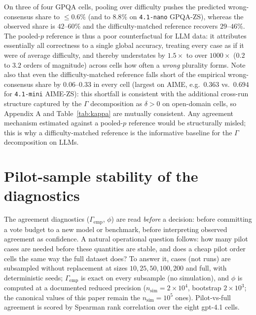 \documentclass[a4paper,fleqn]{cas-sc}
\newcommand{\agreementIndex}{\Gamma}
\begin{document}
On three of four GPQA cells, pooling over difficulty pushes the predicted
wrong-consensus share to $\le0.6\%$ (and to $8.8\%$ on
\texttt{4.1-nano} GPQA-ZS), whereas the observed share is
$42$--$60\%$ and the difficulty-matched reference recovers
$29$--$46\%$. The pooled-$p$ reference is thus a poor counterfactual for
LLM data: it attributes essentially all correctness to a single global
accuracy, treating every case as if it were of average difficulty, and thereby
understates by $1.5\times$ to over $1000\times$ ($0.2$ to $3.2$ orders of magnitude) across cells how often a \emph{wrong} plurality
forms. Note also that even the difficulty-matched reference falls short
of the empirical wrong-consensus share by
$0.06$--$0.33$ in every cell (largest on AIME, e.g.\ $0.363$ vs.\ $0.694$
for \texttt{4.1-mini} AIME-ZS): this shortfall is consistent with the additional cross-run
structure captured by the $\agreementIndex$ decomposition as $\delta>0$ on open-domain
cells, so Appendix A and Table~\ref{tab:kappa} are mutually consistent.
Any agreement mechanism estimated against a pooled-$p$ reference would be
structurally misled; this is why a difficulty-matched reference is the
informative baseline for the $\agreementIndex$ decomposition on LLMs.

\section{Pilot-sample stability of the diagnostics}
\label{app:pilot}

The agreement diagnostics ($\agreementIndex_{\mathrm{emp}}$, $\phi$) are read
\emph{before} a decision: before committing a vote budget to a new
model or benchmark, before interpreting observed agreement as
confidence. A natural operational question follows: how many pilot cases
are needed before these quantities are stable, and does a cheap pilot
order cells the same way the full dataset does? To answer it, cases (not
runs) are subsampled without replacement at sizes
$10,25,50,100,200$ and full, with deterministic seeds; $\agreementIndex_{\mathrm{emp}}$
is exact on every subsample (no simulation), and $\phi$ is computed at a
documented reduced precision ($n_{\mathrm{sim}}=2\times10^4$, bootstrap
$2\times10^3$; the canonical values of this paper remain the
$n_{\mathrm{sim}}=10^5$ ones). Pilot-vs-full agreement is scored by
Spearman rank correlation over the eight gpt-4.1 cells.
\end{document}
